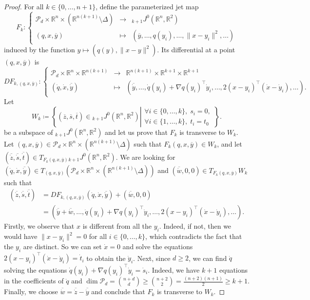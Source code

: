 \documentclass{amsart}
\newcommand{\R}{\mathbb{R}}
\newcommand{\Poly}{\mathscr{P}}
\theoremstyle{definition}
\theoremstyle{remark}
\begin{document}
\begin{proof}
For all $k \in \{0, \ldots, n + 1\}$, define the parameterized jet map
\[
F_k \colon \left\{
\begin{array}{ccc}
\Poly_d \times \R^n \times (\R^{n(k + 1)} \setminus \Delta) & \to & {}_{k + 1} J^0(\R^n, \R^2) \\
(q, x, \overline{y}) & \mapsto & (\overline{y}, \ldots, q(y_i), \ldots, \| x - y_i \|^2, \ldots)
\end{array}
\right.
\]
induced by the function $y \mapsto (q(y), \| x - y \|^2)$. Its differential at a point $(q, x, \overline y)$ is
\[
DF_{k, (q, x, \overline{y})} \colon \left\{ \begin{array}{ccc}
\Poly_d \times \R^n \times \R^{n (k + 1)} & \to & \R^{n (k + 1)} \times \R^{k + 1} \times \R^{k + 1} \\
(\dot{q}, \dot{x}, \overline{\dot{y}}) & \mapsto & (\overline{\dot{y}}, \ldots, \dot{q}(y_i) + \nabla q(y_i)^\top \dot{y}_i, \ldots, 2(x - y_i)^\top (\dot{x} - \dot{y}_i), \ldots).
\end{array} \right.
\]
Let
\[
W_k \coloneqq \left\{
(\overline z, \overline s, \overline t) \in {}_{k + 1} J^0(\R^n, \R^2)
\left|
\begin{array}{l}
\forall i \in \{0, \ldots, k\}, \; s_i = 0, \\
\forall i \in \{1, \ldots, k\}, \; t_i = t_0
\end{array}
\right.
\right\}.
\]
be a subspace of ${}_{k + 1} J^0(\R^n, \R^2)$ and let us prove that $F_k$ is transverse to $W_k$. Let $(q, x, \overline{y}) \in \Poly_d \times \R^n \times (\R^{n(k + 1)} \setminus \Delta)$ such that $F_k(q, x, \overline{y}) \in W_k$, and let $(\overline{\dot{z}}, \overline{\dot{s}}, \overline{\dot{t}}) \in T_{F_k(q, x, \overline{y})} {}_{k + 1} J^0(\R^n, \R^2)$. We are looking for $(\dot{q}, \dot{x}, \overline{\dot{y}}) \in T_{(q, x, \overline{y})} (\Poly_d \times \R^n \times (\R^{n(k + 1)} \setminus \Delta))$ and $(\overline{\dot{w}}, 0, 0) \in T_{F_k(q, x, \overline{y})} W_k$ such that
\begin{align}
(\overline{\dot{z}}, \overline{\dot{s}}, \overline{\dot{t}}) & = DF_{k, (q, x, \overline{y})} (\dot{q}, \dot{x}, \overline{\dot{y}}) + (\overline{\dot{w}}, 0, 0) \\
& = (\overline{\dot{y}} + \overline{\dot{w}}, \ldots, \dot{q}(y_i) + \nabla q(y_i)^\top \dot{y}_i, \ldots, 2(x - y_i)^\top (\dot{x} - \dot{y}_i), \ldots).
\end{align}
Firstly, we observe that $x$ is different from all the $y_i$. Indeed, if not, then we would have $\| x - y_i \|^2 = 0$ for all $i \in \{0, \ldots, k\}$, which contradicts the fact that the $y_i$ are distinct. So we can set $\dot{x} = 0$ and solve the equations $2(x - y_i)^\top (\dot{x} - \dot{y}_i) = \dot{t}_i$ to obtain the $\dot{y}_i$.
Next, since $d \geq 2$, we can find $\dot{q}$ solving the equations $\dot{q}(y_i) + \nabla q(y_i)^\top \dot{y}_i = \dot{s}_i$. Indeed, we have $k + 1$ equations in the coefficients of $\dot{q}$ and $\dim \Poly_d = \binom{n + d}{d} \geq \binom{n + 2}{2} = \frac{(n + 2)(n + 1)}{2} \geq k + 1$.
Finally, we choose $\overline{\dot{w}} = \overline{\dot{z}} - \overline{\dot{y}}$ and conclude that $F_k$ is transverse to $W_k$.


\end{proof}
\end{document}
